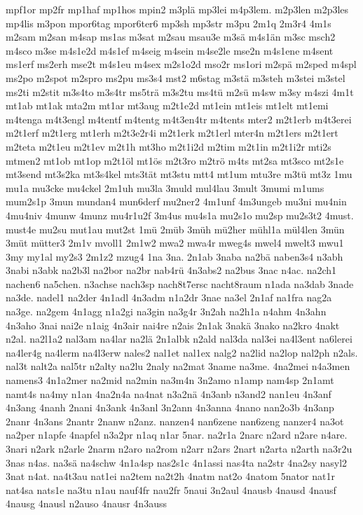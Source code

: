 {mpf1or
mp2fr
mp1haf
mp1hos
mpin2
m3plä
mp3lei
m4p3lem.
m2p3len
m2p3les
mp4lis
m3pon
mpor6tag
mpor6ter6
mp3sh
mp3str
m3pu
2m1q
2m3r4
4m1s
m2sam
m2san
m4sap
ms1as
m3sat
m2sau
msau3e
m3sä
m4s1än
m3sc
msch2
m4sco
m3se
m4s1e2d
m4s1ef
m4seig
m4sein
m4se2le
mse2n
m4s1ene
m4sent
ms1erf
ms2erh
mse2t
m4s1eu
m4sex
m2s1o2d
mso2r
ms1ori
m2spä
m2sped
m4spl
ms2po
m2spot
m2spro
ms2pu
ms3s4
mst2
m6stag
m3stä
m3steh
m3stei
m3stel
ms2ti
m2stit
m3s4to
m3s4tr
ms5trä
m3s2tu
ms4tü
m2sü
m4sw
m3sy
m4szi
4m1t
mt1ab
mt1ak
mta2m
mt1ar
mt3aug
m2t1e2d
mt1ein
mt1eis
mt1elt
mt1emi
m4tenga
m4t3engl
m4tentf
m4tentg
m4t3en4tr
m4tents
mter2
m2t1erb
m4t3erei
m2t1erf
m2t1erg
mt1erh
m2t3e2r4i
m2t1erk
m2t1erl
mter4n
m2t1ers
m2t1ert
m2teta
m2t1eu
m2t1ev
m2t1h
mt3ho
m2t1i2d
m2tim
m2t1in
m2t1i2r
mti2s
mtmen2
mt1ob
mt1op
m2t1öl
mt1ös
m2t3ro
m2trö
m4ts
mt2sa
mt3sco
mt2s1e
mt3send
mt3s2ka
mt3s4kel
mts3tät
mt3stu
mtt4
mt1um
mtu3re
m3tü
mt3z
1mu
mu1a
mu3cke
mu4ckel
2m1uh
mu3la
3muld
mul4lau
3mult
3mumi
m1ums
mum2s1p
3mun
mundan4
mun6derf
mu2ner2
4m1unf
4m3ungeb
mu3ni
mu4nin
4mu4niv
4munw
4munz
mu4r1u2f
3m4us
mu4s1a
mu2s1o
mu2sp
mu2s3t2
4must.
must4e
mu2su
mut1au
mut2st
1mü
2müb
3müh
mü2her
mühl1a
mül4len
3mün
3müt
mütter3
2m1v
mvoll1
2m1w2
mwa2
mwa4r
mweg4s
mwel4
mwelt3
mwu1
3my
my1al
my2s3
2m1z2
mzug4
1na
3na.
2n1ab
3naba
na2bä
naben3s4
n3abh
3nabi
n3abk
na2b3l
na2bor
na2br
nab4rü
4n3abs2
na2bus
3nac
n4ac.
na2ch1
nachen6
na5chen.
n3achse
nach3sp
nach8t7ersc
nacht8raum
n1ada
na3dab
3nade
na3de.
nadel1
na2der
4n1adl
4n3adm
n1a2dr
3nae
na3el
2n1af
na1fra
nag2a
na3ge.
na2gem
4n1agg
n1a2gi
na3gin
na3g4r
3n2ah
na2h1a
n4ahm
4n3ahn
4n3aho
3nai
nai2e
n1aig
4n3air
nai4re
n2ais
2n1ak
3nakä
3nako
na2kro
4nakt
n2al.
na2l1a2
nal3am
na4lar
na2lä
2n1albk
n2ald
nal3da
nal3ei
na4l3ent
na6lerei
na4ler4g
na4lerm
na4l3erw
nales2
nal1et
nal1ex
nalg2
na2lid
na2lop
nal2ph
n2als.
nal3t
nalt2a
nal5tr
n2alty
na2lu
2naly
na2mat
3name
na3me.
4na2mei
n4a3men
namens3
4n1a2mer
na2mid
na2min
na3m4n
3n2amo
n1amp
nam4sp
2n1amt
namt4s
na4my
n1an
4na2n4a
na4nat
n3a2nä
4n3anb
n3and2
nan1eu
4n3anf
4n3ang
4nanh
2nani
4n3ank
4n3anl
3n2ann
4n3anna
4nano
nan2o3b
4n3anp
2nanr
4n3ans
2nantr
2nanw
n2anz.
nanzen4
nan6zene
nan6zeng
nanzer4
na3ot
na2per
n1apfe
4napfel
n3a2pr
n1aq
n1ar
5nar.
na2r1a
2narc
n2ard
n2are
n4are.
3nari
n2ark
n2arle
2narm
n2aro
na2rom
n2arr
n2ars
2nart
n2arta
n2arth
na3r2u
3nas
n4as.
na3sä
na4schw
4n1a4sp
nas2s1c
4n1assi
nas4ta
na2str
4na2sy
nasyl2
3nat
n4at.
na4t3au
nat1ei
na2tem
na2t2h
4natm
nat2o
4natom
5nator
nat1r
nat4sa
nats1e
na3tu
n1au
nauf4fr
nau2fr
5naui
3n2aul
4nausb
4nausd
4nausf
4nausg
4nausl
n2auso
4nausr
4n3auss
}
